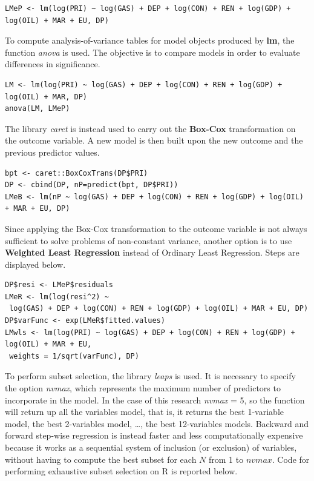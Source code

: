 \documentclass{book}
\begin{document}
\begin{appendices}
\begin{verbatim}
LMeP <- lm(log(PRI) ~ log(GAS) + DEP + log(CON) + REN + log(GDP) + log(OIL) + MAR + EU, DP)
\end{verbatim}

To compute analysis-of-variance tables for model objects produced by \textbf{lm}, the function \textit{anova} is used. The objective is to compare models in order to evaluate differences in significance.

\begin{verbatim}
LM <- lm(log(PRI) ~ log(GAS) + DEP + log(CON) + REN + log(GDP) + log(OIL) + MAR, DP)
anova(LM, LMeP)
\end{verbatim}

The library \textit{caret} is instead used to carry out the \textbf{Box-Cox} transformation on the outcome variable. A new model is then built upon the new outcome and the previous predictor values.

\begin{verbatim}
bpt <- caret::BoxCoxTrans(DP$PRI)
DP <- cbind(DP, nP=predict(bpt, DP$PRI))
LMeB <- lm(nP ~ log(GAS) + DEP + log(CON) + REN + log(GDP) + log(OIL) + MAR + EU, DP)
\end{verbatim}
\end{appendices}

Since applying the Box-Cox transformation to the outcome variable is not always sufficient to solve problems of non-constant variance, another option is to use \textbf{Weighted Least Regression} instead of Ordinary Least Regression. Steps are displayed below.

\begin{verbatim}
DP$resi <- LMeP$residuals
LMeR <- lm(log(resi^2) ~
 log(GAS) + DEP + log(CON) + REN + log(GDP) + log(OIL) + MAR + EU, DP)
DP$varFunc <- exp(LMeR$fitted.values)
LMwls <- lm(log(PRI) ~ log(GAS) + DEP + log(CON) + REN + log(GDP) + log(OIL) + MAR + EU,
 weights = 1/sqrt(varFunc), DP)
\end{verbatim}

To perform subset selection, the library \textit{leaps} is used. It is necessary to specify the option \textit{nvmax}, which represents the maximum number of predictors to incorporate in the model. In the case of this research \textit{nvmax} = 5, so the function will return up all the variables model, that is, it returns the best 1-variable model, the best 2-variables model, …, the best 12-variables models. Backward and forward step-wise regression is instead faster and less computationally expensive because it works as a sequential system of inclusion (or exclusion) of variables, without having to compute the best subset for each $N$ from 1 to $nvmax$. Code for performing exhaustive subset selection on R is reported below.
\end{document}
